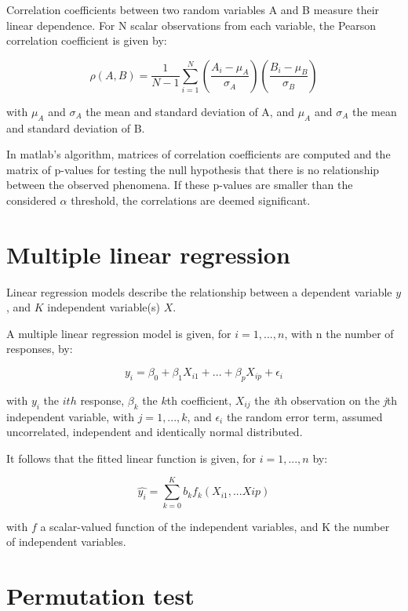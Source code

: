 Correlation coefficients between two random variables A and B measure their linear dependence. For N scalar observations from each variable, the Pearson correlation coefficient is given by:

\begin{equation}
\rho(A, B) = \dfrac{1}{N-1} \sum_{i=1}^N \left( \dfrac{A_i - \mu _A}{\sigma _A}\right) \left( \dfrac{B_i - \mu_B}{\sigma _B}\right)
\end{equation}

with $\mu_A$ and $\sigma_A$ the mean and standard deviation of A, and $\mu_A$ and $\sigma_A$ the mean and standard deviation of B.

In matlab's algorithm, matrices of correlation coefficients are computed and the matrix of p-values for testing the null hypothesis that there is no relationship between the observed phenomena. If these p-values are smaller than the considered $\alpha$ threshold, the correlations are deemed significant.

\section{Multiple linear regression}
\label{subsec:subcsectionC}

Linear regression models describe the relationship between a dependent variable $y$, and $K$ independent variable(s) $X$.

A multiple linear regression model is given, for $i=1,...,n$, with n the number of responses, by:

\begin{equation}
y_i=\beta_0 + \beta_1 X_{i1}+...+\beta_p X_{ip}+\epsilon_i
\end{equation}

with $y_i$ the $ith$ response, $\beta_k$ the $k$th coefficient, $X_{ij}$ the \textit{i}th observation on the \textit{j}th independent variable, with $j=1,...,k$, and $\epsilon_i$ the random error term, assumed uncorrelated, independent and identically normal distributed. 

It follows that the fitted linear function is given, for $i=1, ..., n$ by:

\begin{equation}
\hat{y_i}= \sum _{k=0}^K b_k f_k(X_{i1},...X{ip})
\end{equation}

with $f$ a scalar-valued function of the independent variables, and K the number of independent variables.
\section{Permutation test}

